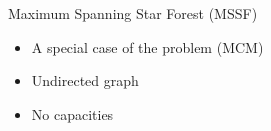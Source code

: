 \begin{frame}{Maximum Spanning Star Forest (MSSF)}

\begin{itemize}
\item<1> A special case of the \MCM{} problem (MCM)
\item<2> Undirected graph
\item<3> No capacities
\end{itemize}

\centering


\end{frame}